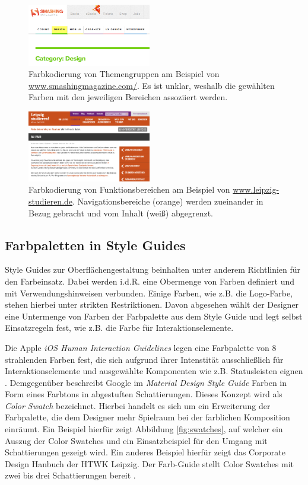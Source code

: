 \documentclass[11pt,a4paper,bibliography=totoc,twocolumn]{scrartcl}
\begin{document}
\begin{figure}[h]
	\centering
	\includegraphics[width=0.48\textwidth]{img/theme_coding.png}
	\caption{Farbkodierung von Themengruppen am Beispiel von \url{www.smashingmagazine.com/}. Es ist unklar, weshalb die gewählten Farben mit den jeweiligen Bereichen assoziiert werden.}
	\label{fig:theme_coding}
\end{figure}

\begin{figure}[h]
	\centering
	\includegraphics[width=0.48\textwidth]{img/functional_areas}
	\caption{Farbkodierung von Funktionsbereichen am Beispiel von \url{www.leipzig-studieren.de}. Navigationsbereiche (orange) werden zueinander in Bezug gebracht und vom Inhalt (weiß) abgegrenzt.}
	\label{fig:functional_areas}
\end{figure}


\subsection{Farbpaletten in Style Guides}
\label{sec:swatches}

Style Guides zur Oberflächengestaltung beinhalten unter anderem Richtlinien für den Farbeinsatz. Dabei werden i.d.R. eine Obermenge von Farben definiert und mit Verwendungshinweisen verbunden. Einige Farben, wie z.B. die Logo-Farbe, stehen hierbei unter strikten Restriktionen. Davon abgesehen wählt der Designer eine Untermenge von Farben der Farbpalette aus dem Style Guide und legt selbst Einsatzregeln fest, wie z.B. die Farbe für Interaktionselemente.

Die Apple \emph{iOS Human Interaction Guidelines} legen eine Farbpalette von 8 strahlenden Farben fest, die sich aufgrund ihrer Intenstität ausschließlich für Interaktionselemente und ausgewählte Komponenten wie z.B. Statusleisten eignen \citep{ios}. Demgegenüber beschreibt Google im \emph{Material Design Style Guide} Farben in Form eines Farbtons in abgestuften Schattierungen. Dieses Konzept wird als \emph{Color Swatch} bezeichnet. Hierbei handelt es sich um ein Erweiterung der Farbpalette, die dem Designer mehr Spielraum bei der farblichen Komposition einräumt. Ein Beispiel hierfür zeigt Abbildung \ref{fig:swatches}, auf welcher ein Auszug der Color Swatches und ein Einsatzbeispiel für den Umgang mit Schattierungen gezeigt wird. Ein anderes Beispiel hierfür zeigt das Corporate Design Hanbuch der HTWK Leipzig. Der Farb-Guide stellt Color Swatches mit zwei bis drei Schattierungen bereit \citep{htwk}.
\end{document}
